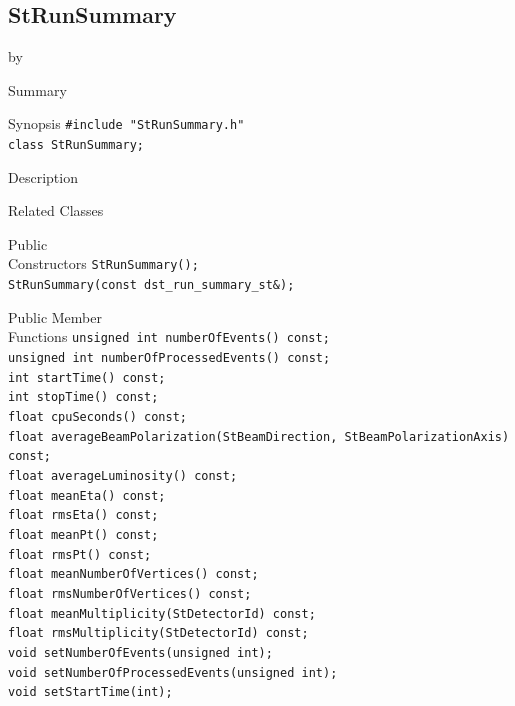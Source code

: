 \documentclass[twoside]{article}
\newcommand{\entrylabel}[1]{\mbox{\textbf{{#1}}}\hfil}%
\newenvironment{entry}
{\begin{list}{}%
    {\renewcommand{\makelabel}{\entrylabel}%
     \setlength{\labelwidth}{90pt}%
     \setlength{\leftmargin}{\labelwidth}
     \advance\leftmargin by \labelsep%
      }%
    }%
  {\end{list}}
\newcommand{\Entrylabel}[1]%
{\raisebox{0pt}[1ex][0pt]{\makebox[\labelwidth][l]%
    {\parbox[t]{\labelwidth}{\hspace{0pt}\textbf{{#1}}}}}}
\newenvironment{Entry}%
{\renewcommand{\entrylabel}{\Entrylabel}\begin{entry}}%
  {\end{entry}}
\begin{document}
\subsection{StRunSummary}
\label{sec:StRunSummary}
\begin{Entry}
\item[Summary]
\item[Synopsis]
    \verb+#include "StRunSummary.h"+\\
    \verb+class StRunSummary;+\\
\item[Description]
\item[Related Classes]
\item[Public\\ Constructors]
    \verb+StRunSummary();+\\
    \verb+StRunSummary(const dst_run_summary_st&);+\\
\item[Public Member\\ Functions]
    \verb+unsigned int numberOfEvents() const;+\\
    \verb+unsigned int numberOfProcessedEvents() const;+\\
    \verb+int startTime() const;+\\
    \verb+int stopTime() const;+\\
    \verb+float cpuSeconds() const;+\\
    \verb+float averageBeamPolarization(StBeamDirection, StBeamPolarizationAxis) const;+\\
    \verb+float averageLuminosity() const;+\\
    \verb+float meanEta() const;+\\
    \verb+float rmsEta() const;+\\
    \verb+float meanPt() const;+\\
    \verb+float rmsPt() const;+\\
    \verb+float meanNumberOfVertices() const;+\\
    \verb+float rmsNumberOfVertices() const;+\\
    \verb+float meanMultiplicity(StDetectorId) const;+\\
    \verb+float rmsMultiplicity(StDetectorId) const;+\\
    \verb+void setNumberOfEvents(unsigned int);+\\
    \verb+void setNumberOfProcessedEvents(unsigned int);+\\
    \verb+void setStartTime(int);+\\

\end{Entry}
\end{document}
